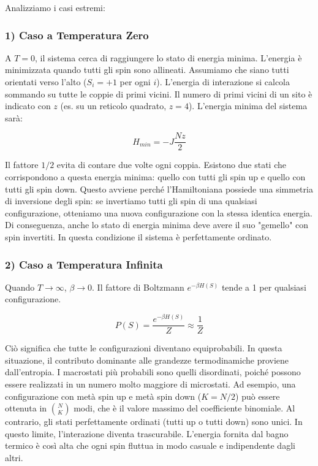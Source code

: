 Analizziamo i casi estremi:

\subsubsection*{1) Caso a Temperatura Zero}
A $T=0$, il sistema cerca di raggiungere lo stato di energia minima. L'energia è minimizzata quando tutti gli spin sono allineati. Assumiamo che siano tutti orientati verso l'alto ($S_i = +1$ per ogni $i$).
L'energia di interazione si calcola sommando su tutte le coppie di primi vicini. Il numero di primi vicini di un sito è indicato con $z$ (es. su un reticolo quadrato, $z=4$).
L'energia minima del sistema sarà:

\begin{equation} \label{eq:ch16_20}
H_{min} = -J \frac{Nz}{2}
\end{equation}

Il fattore $1/2$ evita di contare due volte ogni coppia.
Esistono due stati che corrispondono a questa energia minima: quello con tutti gli spin up e quello con tutti gli spin down. Questo avviene perché l'Hamiltoniana possiede una simmetria di inversione degli spin: se invertiamo tutti gli spin di una qualsiasi configurazione, otteniamo una nuova configurazione con la stessa identica energia. Di conseguenza, anche lo stato di energia minima deve avere il suo "gemello" con spin invertiti. In questa condizione il sistema è perfettamente ordinato.

\subsubsection*{2) Caso a Temperatura Infinita}
Quando $T \rightarrow \infty$, $\beta \rightarrow 0$. Il fattore di Boltzmann $e^{-\beta H(S)}$ tende a 1 per qualsiasi configurazione.

\begin{equation} \label{eq:ch16_21}
P(S) = \frac{e^{-\beta H(S)}}{Z} \approx \frac{1}{Z}
\end{equation}

Ciò significa che tutte le configurazioni diventano equiprobabili. In questa situazione, il contributo dominante alle grandezze termodinamiche proviene dall'entropia. I macrostati più probabili sono quelli disordinati, poiché possono essere realizzati in un numero molto maggiore di microstati. Ad esempio, una configurazione con metà spin up e metà spin down ($K=N/2$) può essere ottenuta in $\binom{N}{K}$ modi, che è il valore massimo del coefficiente binomiale. Al contrario, gli stati perfettamente ordinati (tutti up o tutti down) sono unici.
In questo limite, l'interazione diventa trascurabile. L'energia fornita dal bagno termico è così alta che ogni spin fluttua in modo casuale e indipendente dagli altri.


